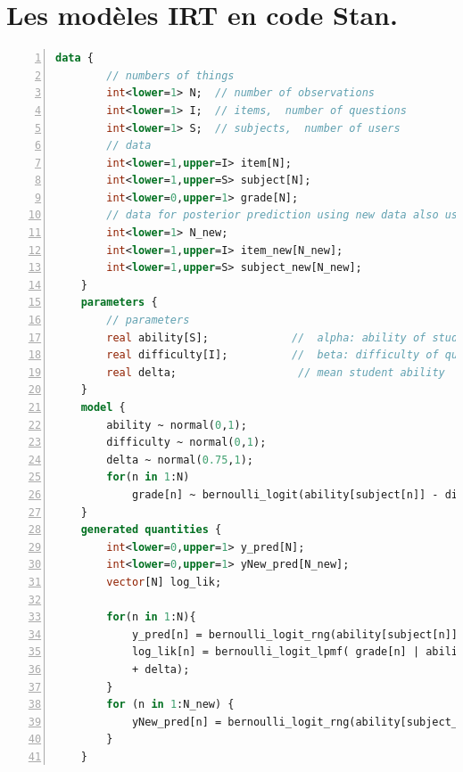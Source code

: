\appendix
{}
\thispagestyle{empty}
\chapter{Les modèles IRT en code Stan.}


\begin{lstlisting}[language=Stan,caption={Code Stan pour le modèle de Rasch},basicstyle=\scriptsize, frame=lines,framesep=4.5mm,framexleftmargin=2.5mm,tabsize=2,numbers=left,fillcolor=\color{white},rulecolor=\color{black},numberstyle=\normalfont\scriptsize\color{black}]
    data {
        // numbers of things
        int<lower=1> N;  // number of observations
        int<lower=1> I;  // items,  number of questions  
        int<lower=1> S;  // subjects,  number of users 
        // data
        int<lower=1,upper=I> item[N];
        int<lower=1,upper=S> subject[N];
        int<lower=0,upper=1> grade[N];
        // data for posterior prediction using new data also used for Cross-validation
        int<lower=1> N_new;
        int<lower=1,upper=I> item_new[N_new];
        int<lower=1,upper=S> subject_new[N_new];
    }
    parameters {
        // parameters
        real ability[S];             //  alpha: ability of student
        real difficulty[I];          //  beta: difficulty of question
        real delta;                   // mean student ability
    }
    model {
        ability ~ normal(0,1);         
        difficulty ~ normal(0,1);   
        delta ~ normal(0.75,1);
        for(n in 1:N)
            grade[n] ~ bernoulli_logit(ability[subject[n]] - difficulty[item[n]] + delta);
    }
    generated quantities {
        int<lower=0,upper=1> y_pred[N];
        int<lower=0,upper=1> yNew_pred[N_new];
        vector[N] log_lik;

        for(n in 1:N){
            y_pred[n] = bernoulli_logit_rng(ability[subject[n]] - difficulty[item[n]] + delta);
            log_lik[n] = bernoulli_logit_lpmf( grade[n] | ability[subject[n]] - difficulty[item[n]]
            + delta);
        }
        for (n in 1:N_new) {
            yNew_pred[n] = bernoulli_logit_rng(ability[subject_new[n]] - difficulty[item_new[n]] + delta);                                             
        }
    }
\end{lstlisting}
\newpage

